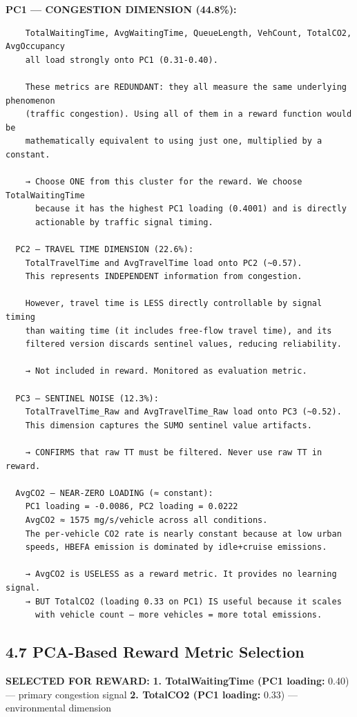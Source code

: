 \documentclass[11pt,a4paper]{article}
\begin{document}
\textbf{PC1 — CONGESTION DIMENSION (44.8\%):}
\vspace{1em}\begin{verbatim}
    TotalWaitingTime, AvgWaitingTime, QueueLength, VehCount, TotalCO2, AvgOccupancy
    all load strongly onto PC1 (0.31-0.40).

    These metrics are REDUNDANT: they all measure the same underlying phenomenon
    (traffic congestion). Using all of them in a reward function would be
    mathematically equivalent to using just one, multiplied by a constant.

    → Choose ONE from this cluster for the reward. We choose TotalWaitingTime
      because it has the highest PC1 loading (0.4001) and is directly
      actionable by traffic signal timing.

  PC2 — TRAVEL TIME DIMENSION (22.6%):
    TotalTravelTime and AvgTravelTime load onto PC2 (~0.57).
    This represents INDEPENDENT information from congestion.

    However, travel time is LESS directly controllable by signal timing
    than waiting time (it includes free-flow travel time), and its
    filtered version discards sentinel values, reducing reliability.

    → Not included in reward. Monitored as evaluation metric.

  PC3 — SENTINEL NOISE (12.3%):
    TotalTravelTime_Raw and AvgTravelTime_Raw load onto PC3 (~0.52).
    This dimension captures the SUMO sentinel value artifacts.

    → CONFIRMS that raw TT must be filtered. Never use raw TT in reward.

  AvgCO2 — NEAR-ZERO LOADING (≈ constant):
    PC1 loading = -0.0086, PC2 loading = 0.0222
    AvgCO2 ≈ 1575 mg/s/vehicle across all conditions.
    The per-vehicle CO2 rate is nearly constant because at low urban
    speeds, HBEFA emission is dominated by idle+cruise emissions.

    → AvgCO2 is USELESS as a reward metric. It provides no learning signal.
    → BUT TotalCO2 (loading 0.33 on PC1) IS useful because it scales
      with vehicle count — more vehicles = more total emissions.

\end{verbatim}
\subsection*{4.7 PCA-Based Reward Metric Selection}
\textbf{SELECTED FOR REWARD:}
\textbf{1. TotalWaitingTime (PC1 loading:} 0.40) — primary congestion signal
\textbf{2. TotalCO2 (PC1 loading:} 0.33) — environmental dimension
\end{document}

